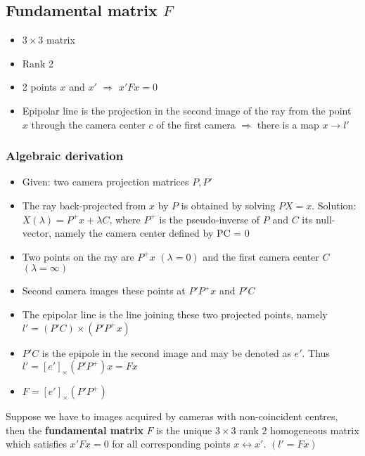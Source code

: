 \documentclass[a4paper]{article}
\begin{document}
\subsection*{Fundamental matrix $F$}
\begin{itemize}
    \item
        $3 \times 3$ matrix
    \item
        Rank 2
    \item
        2 points $x$ and $x'$ $\Rightarrow$ $x' F x = 0$
    \item
        Epipolar line is the projection in the second image of the ray from the point $x$ through the camera center $c$ of the first camera $\Rightarrow$ there is a map $x \rightarrow l'$
\end{itemize}
\subsubsection*{Algebraic derivation}
\begin{itemize}
    \item
        Given: two camera projection matrices $P, P'$
    \item
        The ray back-projected from $x$ by $P$ is obtained by solving $PX = x$. Solution: $X(\lambda) = P^{+} x + \lambda C$, where $P^{+}$ is the pseudo-inverse of $P$ and $C$ its null-vector, namely the camera center defined by PC = 0
    \item
        Two points on the ray are $P^{+}x$ $(\lambda = 0)$ and the first camera center $C$ $(\lambda = \infty)$
    \item
        Second camera images these points at $P'P^{+}x$ and $P'C$
    \item
        The epipolar line is the line joining these two projected points, namely $l' = (P'C) \times (P'P^{+}x)$
    \item
        $P'C$ is the epipole in the second image and may be denoted as $e'$. Thus $l' = [e']_{\times} (P'P^{+})x = Fx$
    \item
        $F = [e']_{\times} (P'P^{+})$
\end{itemize}

Suppose we have to images acquired by cameras with non-coincident centres, then the \textbf{fundamental matrix} $F$ is the unique $3 \times 3$ rank 2 homogeneous matrix which satisfies $x'Fx = 0$ for all corresponding points $x \leftrightarrow x'$. $(l' = Fx)$
\end{document}
